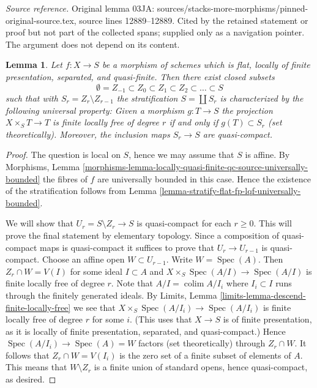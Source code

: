 \documentclass[10pt,a4paper]{amsart}
\theoremstyle{plain}
\newtheorem{lemma}[subsection]{Lemma}
\theoremstyle{definition}
\theoremstyle{remark}
\numberwithin{equation}{subsection}
\def\colim{\mathop{\mathrm{colim}}\nolimits}
\def\Spec{\mathop{\mathrm{Spec}}}
\begin{document}
\noindent\textit{Source reference.} Original lemma 03JA: sources/stacks-more-morphisms/pinned-original-source.tex, source lines 12889--12889. Cited by the retained statement or proof but not part of the collected spans; supplied only as a navigation pointer. The argument does not depend on its content.\par\medskip
\begin{lemma}
\label{lemma-stratify-flat-fp-qf}
Let $f : X \to S$ be a morphism of schemes which is flat, locally of
finite presentation, separated, and quasi-finite. Then there exist
closed subsets
$$
\emptyset = Z_{-1} \subset Z_0 \subset Z_1 \subset Z_2 \subset
\ldots \subset S
$$
such that with $S_r = Z_r \setminus Z_{r - 1}$ the stratification
$S = \coprod S_r$ is characterized by the following universal property:
Given a morphism $g : T \to S$ the projection $X \times_S T \to T$ is
finite locally free of degree $r$ if and only if $g(T) \subset S_r$
(set theoretically). Moreover, the inclusion maps $S_r \to S$ are
quasi-compact.
\end{lemma}

\begin{proof}
The question is local on $S$, hence we may assume that $S$ is affine.
By Morphisms, Lemma
\ref{morphisms-lemma-locally-quasi-finite-qc-source-universally-bounded}
the fibres of $f$ are universally bounded in this case.
Hence the existence of the stratification follows from
Lemma \ref{lemma-stratify-flat-fp-lqf-universally-bounded}.

\medskip\noindent
We will show that $U_r = S \setminus Z_r \to S$ is quasi-compact for
each $r \geq 0$. This will prove the final statement by elementary topology.
Since a composition of quasi-compact maps is quasi-compact
it suffices to prove that $U_r \to U_{r - 1}$ is quasi-compact.
Choose an affine open $W \subset U_{r - 1}$. Write $W = \Spec(A)$.
Then $Z_r \cap W = V(I)$ for some ideal $I \subset A$
and $X \times_S \Spec(A/I) \to \Spec(A/I)$ is finite locally
free of degree $r$. Note that $A/I = \colim A/I_i$ where $I_i \subset I$
runs through the finitely generated ideals. By
Limits, Lemma \ref{limits-lemma-descend-finite-locally-free}
we see that $X \times_S \Spec(A/I_i) \to \Spec(A/I_i)$
is finite locally free of degree $r$ for some $i$. (This uses
that $X \to S$ is of finite presentation, as it is locally of finite
presentation, separated, and quasi-compact.)
Hence $\Spec(A/I_i) \to \Spec(A) = W$ factors (set theoretically)
through $Z_r \cap W$. It follows that $Z_r \cap W = V(I_i)$ is the zero
set of a finite subset of elements of $A$. This means that
$W \setminus Z_r$ is a finite union of standard opens, hence quasi-compact,
as desired.
\end{proof}
\end{document}
